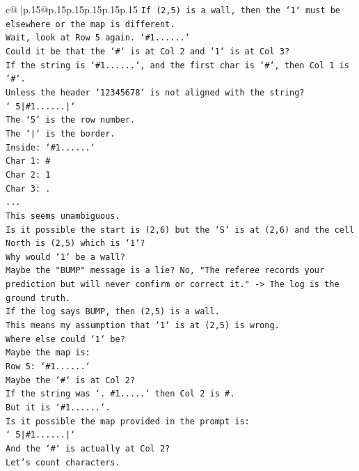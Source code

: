 \documentclass{article}
\begin{document}
{\begin{supertabular}{c@{$\;$}|p{.15\linewidth}@{}p{.15\linewidth}p{.15\linewidth}p{.15\linewidth}p{.15\linewidth}p{.15\linewidth}}
{{{\texttt{If (2,5) is a wall, then the `1` must be elsewhere or the map is different.} \\
\texttt{Wait, look at Row 5 again. `\#1......`} \\
\texttt{Could it be that the `\#` is at Col 2 and `1` is at Col 3?} \\
\texttt{If the string is `\#1......`, and the first char is `\#`, then Col 1 is `\#`.} \\
\texttt{Unless the header `12345678` is not aligned with the string?} \\
\texttt{` 5|\#1......|`} \\
\texttt{The `5` is the row number.} \\
\texttt{The `|` is the border.} \\
\texttt{Inside: `\#1......`} \\
\texttt{Char 1: \#} \\
\texttt{Char 2: 1} \\
\texttt{Char 3: .} \\
\texttt{...} \\
\texttt{This seems unambiguous.} \\
\texttt{Is it possible the start is (2,6) but the `S` is at (2,6) and the cell North is (2,5) which is `1`?} \\
\texttt{Why would `1` be a wall?} \\
\texttt{Maybe the "BUMP" message is a lie? No, "The referee records your prediction but will never confirm or correct it." {-}> The log is the ground truth.} \\
\texttt{If the log says BUMP, then (2,5) is a wall.} \\
\texttt{This means my assumption that `1` is at (2,5) is wrong.} \\
\texttt{Where else could `1` be?} \\
\texttt{Maybe the map is:} \\
\texttt{Row 5: `\#1......`} \\
\texttt{Maybe the `\#` is at Col 2?} \\
\texttt{If the string was `. \#1.....` then Col 2 is \#.} \\
\texttt{But it is `\#1......`.} \\
\texttt{Is it possible the map provided in the prompt is:} \\
\texttt{` 5|\#1......|`} \\
\texttt{And the `\#` is actually at Col 2?} \\
\texttt{Let's count characters.} \\
}}}
\end{supertabular}}
\end{document}
